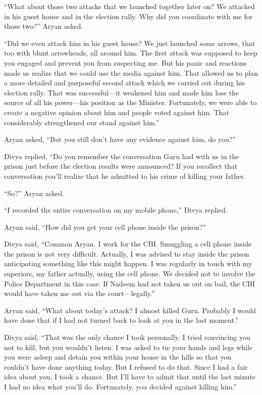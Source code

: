 “What about those two attacks that we launched together later on? We attacked in
his guest house and in the election rally. Why did you coordinate with me for
those two?” Aryan asked.

“Did we even attack him in his guest house? We just launched some arrows, that
too with blunt arrowheads, all around him. The first attack was supposed to keep
you engaged and prevent you from suspecting me. But his panic and reactions made
us realize that we could use the media against him. That allowed us to plan a
more detailed and purposeful second attack which we carried out during his
election rally. That was successful—it weakened him and made him lose the
source of all his power—his position as the Minister. Fortunately, we were
able to create a negative opinion about him and people voted against him. That
considerably strengthened our stand against him.”

Aryan asked, “But you still don't have any evidence against him, do you?”

Divya replied, “Do you remember the conversation Guru had with us in the prison
just before the election results were announced? If you recollect that
conversation you'll realize that he admitted to his crime of killing your
father.

“So?” Aryan asked.

“I recorded the entire conversation on my mobile phone,” Divya replied.

Aryan said, “How did you get your cell phone inside the prison?”

Divya said, “Common Aryan. I work for the CBI. Smuggling a cell phone inside the
prison is not very difficult. Actually, I was advised to stay inside the prison
anticipating something like this might happen. I was regularly in touch with my
superiors, my father actually, using the cell phone. We decided not to involve
the Police Department in this case. If Nadeem had not taken us out on bail, the
CBI would have taken me out via the court—legally.”

Aryan said, “What about today's attack? I almost killed Guru. Probably I would
have done that if I had not turned back to look at you in the last moment.”

Divya said, “That was the only chance I took personally. I tried convincing you
not to kill, but you wouldn't listen. I was asked to tie your hands and legs
while you were asleep and detain you within your house in the hills so that you
couldn't have done anything today. But I refused to do that. Since I had a fair
idea about you, I took a chance. But I'll have to admit that until the last
minute I had no idea what you'll do. Fortunately, you decided against killing
him.”

